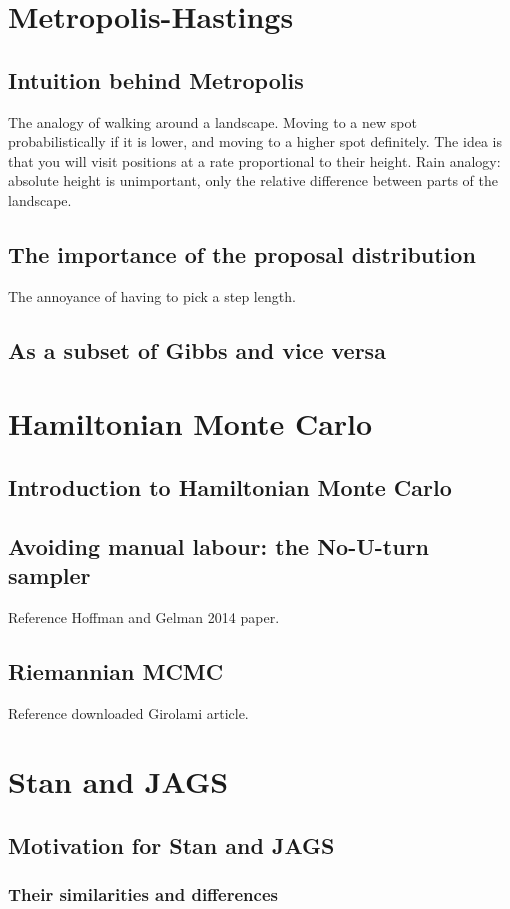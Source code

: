 \documentclass[11pt,fullpage]{book}
\begin{document}
\chapter{Metropolis-Hastings}
\section{Intuition behind Metropolis}
The analogy of walking around a landscape. Moving to a new spot probabilistically if it is lower, and moving to a higher spot definitely. The idea is that you will visit positions at a rate proportional to their height. Rain analogy: absolute height is unimportant, only the relative difference between parts of the landscape.
\section{The importance of the proposal distribution}
The annoyance of having to pick a step length.

\section{As a subset of Gibbs and vice versa}

\chapter{Hamiltonian Monte Carlo}
\section{Introduction to Hamiltonian Monte Carlo}
\section{Avoiding manual labour: the No-U-turn sampler}
Reference Hoffman and Gelman 2014 paper.
\section{Riemannian MCMC}
Reference downloaded Girolami article.

\chapter{Stan and JAGS}
\section{Motivation for Stan and JAGS}
\subsection{Their similarities and differences}
\end{document}
